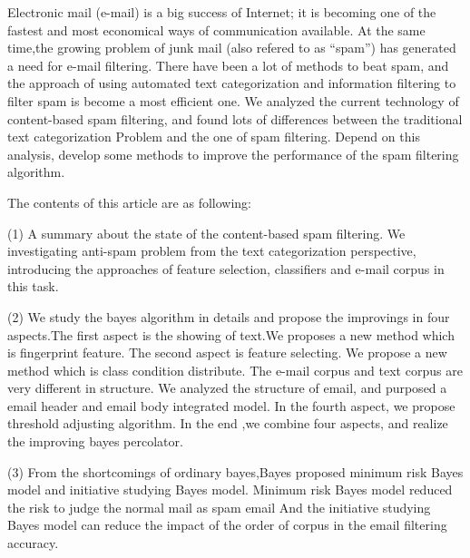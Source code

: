 \begin{enabstract}
  Electronic mail (e-mail) is a big success of Internet; it is becoming one of the fastest  and most economical ways of communication available. At the same time,the growing problem of junk mail (also refered to as “spam”) has generated a need for e-mail filtering. There have been a lot of methods to beat spam, and the approach of using automated text categorization and information filtering to filter spam is become a most efficient one. We analyzed the current technology of content-based spam filtering, and found lots of differences between the traditional text categorization Problem and the one of spam filtering. Depend on this analysis, develop some methods to improve the performance of the spam filtering algorithm.
  
  The contents of this article are as following:
  
  (1) A summary about the state of the content-based spam filtering. We investigating anti-spam problem from the text categorization perspective, introducing the approaches of feature selection, classifiers and e-mail corpus in this task. 
  
   (2) We study the bayes algorithm in details and propose the improvings in four aspects.The first aspect is the showing of text.We proposes a new method which is fingerprint feature. The second aspect is feature selecting. We propose a new method which is class condition distribute. The e-mail corpus and text corpus are very different in structure. We analyzed the structure of email, and purposed a email header and email body integrated model. In the fourth aspect, we propose threshold adjusting algorithm. In the end ,we combine four aspects, and realize the improving bayes percolator. 
   
    (3)  From the shortcomings of ordinary  bayes,Bayes proposed minimum risk  Bayes model and initiative studying  Bayes model. Minimum risk Bayes model reduced the risk to judge the normal mail as spam email And the initiative  studying  Bayes model can reduce  the impact of the order of corpus in the email filtering accuracy. 

\end{enabstract}
